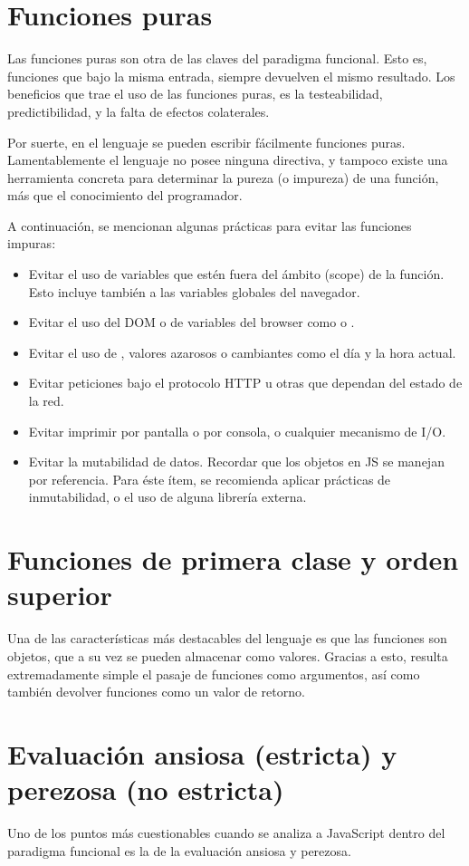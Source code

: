\section{Funciones puras}

Las funciones puras son otra de las claves del paradigma funcional. Esto es, funciones que bajo la misma entrada, siempre devuelven el mismo resultado. Los beneficios que trae el uso de las funciones puras, es la testeabilidad, predictibilidad, y la falta de efectos colaterales.

Por suerte, en el lenguaje se pueden escribir fácilmente funciones puras. Lamentablemente el lenguaje no posee ninguna directiva, y tampoco existe una herramienta concreta para determinar la pureza (o impureza) de una función, más que el conocimiento del programador.

A continuación, se mencionan algunas prácticas para evitar las funciones impuras:

\begin{itemize}
  \item Evitar el uso de variables que estén fuera del ámbito (scope) de la función. Esto incluye también a las variables globales del navegador.
  \item Evitar el uso del DOM o de variables del browser como  o .
	\item Evitar el uso de , valores azarosos o cambiantes como el día y la hora actual.
	\item Evitar peticiones bajo el protocolo HTTP u otras que dependan del estado de la red.
	\item Evitar imprimir por pantalla o por consola, o cualquier mecanismo de I/O.
	\item Evitar la mutabilidad de datos. Recordar que los objetos en JS se manejan por referencia. Para éste ítem, se recomienda aplicar prácticas de inmutabilidad, o el uso de alguna librería externa.
\end{itemize}

\section{Funciones de primera clase y orden superior}

Una de las características más destacables del lenguaje es que las funciones son objetos, que a su vez se pueden almacenar como valores. Gracias a esto, resulta extremadamente simple el pasaje de funciones como argumentos, así como también devolver funciones como un valor de retorno.

\section{Evaluación ansiosa (estricta) y perezosa (no estricta)}

Uno de los puntos más cuestionables cuando se analiza a JavaScript dentro del paradigma funcional es la de la evaluación ansiosa y perezosa.